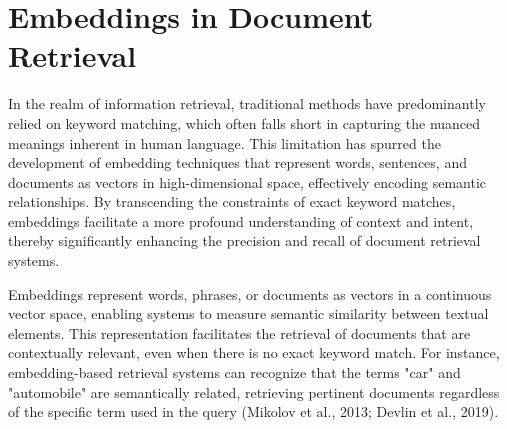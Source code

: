 




\section{Embeddings in Document Retrieval}

\noindent In the realm of information retrieval, traditional methods have predominantly relied on keyword matching, which often falls short in capturing the nuanced meanings inherent in human language. This limitation has spurred the development of embedding techniques that represent words, sentences, and documents as vectors in high-dimensional space, effectively encoding semantic relationships. By transcending the constraints of exact keyword matches, embeddings facilitate a more profound understanding of context and intent, thereby significantly enhancing the precision and recall of document retrieval systems.

Embeddings represent words, phrases, or documents as vectors in a continuous vector space, enabling systems to measure semantic similarity between textual elements. This representation facilitates the retrieval of documents that are contextually relevant, even when there is no exact keyword match. For instance, embedding-based retrieval systems can recognize that the terms "car" and "automobile" are semantically related, retrieving pertinent documents regardless of the specific term used in the query (Mikolov et al., 2013; Devlin et al., 2019).


